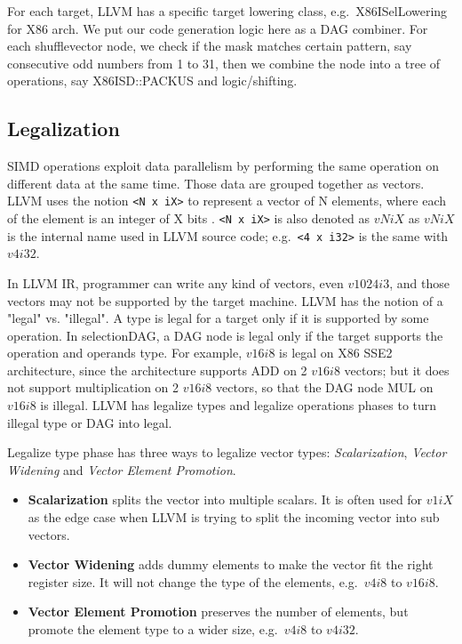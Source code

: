 For each target, LLVM has a specific target lowering class, e.g.\ X86ISelLowering for X86 arch. We put our code generation logic here as a DAG combiner. For each shufflevector node, we check if the mask matches certain pattern, say consecutive odd numbers from 1 to 31, then we combine the node into a tree of operations, say X86ISD::PACKUS and logic/shifting.

\subsection{Legalization}
SIMD operations exploit data parallelism by performing the same operation on different data at the same time. Those data are grouped together as vectors. LLVM uses the notion \verb|<N x iX>| to represent a vector of N elements, where each of the element is an integer of X bits \cite{llvm_lang_ref, hybrid_simd_type_legalize}. \verb|<N x iX>| is also denoted as $vNiX$ as $vNiX$ is the internal name used in LLVM source code; e.g.\ \verb|<4 x i32>| is the same with $v4i32$.

In LLVM IR, programmer can write any kind of vectors, even $v1024i3$, and those vectors may not be supported by the target machine. LLVM has the notion of a "legal" vs. "illegal". A type is legal for a target only if it is supported by some operation. In selectionDAG, a DAG node is legal only if the target supports the operation and operands type. For example, $v16i8$ is legal on X86 SSE2 architecture, since the architecture supports ADD on 2 $v16i8$ vectors; but it does not support multiplication on 2 $v16i8$ vectors, so that the DAG node MUL on $v16i8$ is illegal. LLVM has legalize types and legalize operations phases to turn illegal type or DAG into legal\cite{llvm_code_gen}.

Legalize type phase has three ways to legalize vector types\cite{hybrid_simd_type_legalize}: \textit{Scalarization}, \textit{Vector Widening} and \textit{Vector Element Promotion}.

\begin{itemize}
    \item \textbf{Scalarization} splits the vector into multiple scalars. It is often used for $v1iX$ as the edge case when LLVM is trying to split the incoming vector into sub vectors.
    \item \textbf{Vector Widening} adds dummy elements to make the vector fit the right register size. It will not change the type of the elements, e.g.\ $v4i8$ to $v16i8$.
    \item \textbf{Vector Element Promotion} preserves the number of elements, but promote the element type to a wider size, e.g.\ $v4i8$ to $v4i32$.
\end{itemize}

